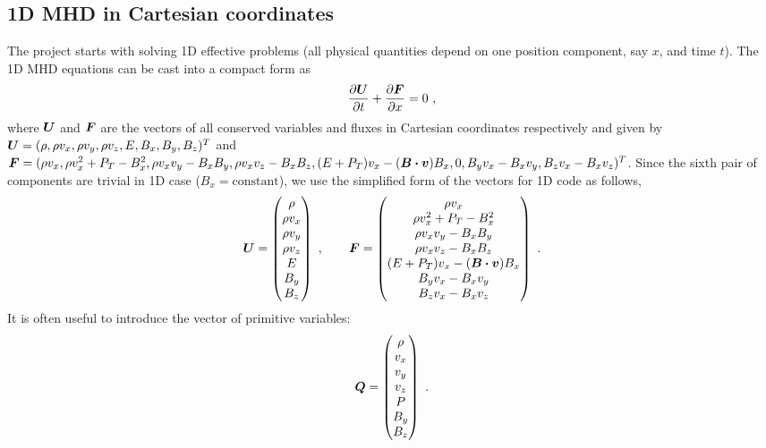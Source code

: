 \documentclass[10.5pt]{article}
\begin{document}
\subsection{1D MHD in Cartesian coordinates}
The project starts with solving 1D effective problems (all physical quantities depend on 
one position component, say $x$, and time $t$). 
The 1D MHD equations can be cast into a compact form as 
\begin{align}
	\pdv{\vb*{U}}{t}+\pdv{\vb*{F}}{x}=0 \ ,
\end{align}
where $\vb*{U}$ and $\vb*{F}$ are the vectors 
of all conserved 
variables and fluxes in Cartesian coordinates respectively and given by
$\vb*{U}=(\rho,\rho v_x, \rho v_y, \rho v_z, E, B_x, B_y, B_z)^T$ and 
$\vb*{F}=(\rho v_x, \rho v_x^2 + P_T -B_x^2,\rho v_x v_y - B_x B_y, \rho v_x v_z - B_x B_z, (E+P_T)v_x - (\vb*{B}\vdot\vb*{v}) B_x, 0, B_y v_x - B_x v_y, B_z v_x - B_x v_z)^T$. 
Since the sixth pair of components are trivial in 1D case ($B_x=\text{constant}$), 
we use the simplified form of the 
vectors for 1D code as follows,
\begin{align}
	\vb*{U}=\begin{pmatrix}
	\rho \\
	\rho v_x \\
	\rho v_y \\
	\rho v_z \\
	E \\
	B_y \\
	B_z
	\end{pmatrix} \ , 
	\qquad 
	\vb*{F}=\begin{pmatrix}
	\rho v_x \\
	\rho v_x^2 + P_T -B_x^2 \\
	\rho v_x v_y - B_x B_y \\
	\rho v_x v_z - B_x B_z \\
	(E+P_T)v_x - (\vb*{B}\vdot\vb*{v}) B_x \\
	B_y v_x - B_x v_y \\
	B_z v_x - B_x v_z
	\end{pmatrix} \ .
\end{align}
It is often useful to introduce the vector of primitive variables:
\begin{align}
	\vb*{Q}=\begin{pmatrix}
		\rho \\
		v_x \\
		v_y \\
		v_z \\
		P \\
		B_y \\
		B_z
	\end{pmatrix} \ .
\end{align}
\end{document}
